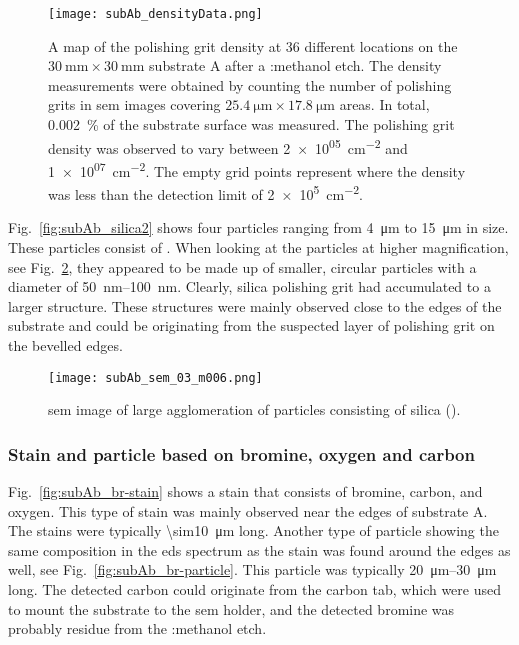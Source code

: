 \begin{figure}[htbp]
    \centering
    \texttt{[image: subAb\_densityData.png]}
    \caption[Map of the polishing grit density on substrate A after a :methanol etch.]{A map of the polishing grit density at 36 different locations on the $\SI{30}{\milli\metre}\times\SI{30}{\milli\metre}$ substrate A after a :methanol etch. The density measurements were obtained by counting the number of polishing grits in \ac{sem} images covering $\SI{25.4}{\micro\metre}\times\SI{17.8}{\micro\metre}$ areas. In total, \SI{0.002}{\percent} of the substrate surface was measured. The polishing grit density was observed to vary between \SI{2e+05}{\centi\metre^{-2}} and \SI{1e+07}{\centi\metre^{-2}}. The empty grid points represent where the density was less than the detection limit of \SI{2e+5}{\centi\metre^{-2}}.}
    \label{fig:subAb_densityData}
\end{figure}

Fig.~\ref{fig:subAb_silica2} shows four particles ranging from \SI{4}{\micro\metre} to \SI{15}{\micro\metre} in size. These particles consist of . When looking at the particles at higher magnification, see Fig.~\ref{fig:subAb_silica2_magnified}, they appeared to be made up of smaller, circular particles with a diameter of \SIrange{50}{100}{\nano\metre}. Clearly, silica polishing grit had accumulated to a larger structure. These structures were mainly observed close to the edges of the substrate and could be originating from the suspected layer of polishing grit on the bevelled edges.

\begin{figure}
    \centering
    \texttt{[image: subAb\_sem\_03\_m006.png]}
    \caption[\Ac{sem} image of large silica agglomeration.]{\Ac{sem} image of large agglomeration of particles consisting of silica ().}\label{fig:subAb_silica2_magnified}
\end{figure}

\subsubsection{Stain and particle based on bromine, oxygen and carbon}

Fig.~\ref{fig:subAb_br-stain} shows a stain that consists of bromine, carbon, and oxygen. This type of stain was mainly observed  near the edges of substrate A. The stains were typically \SI{\sim10}{\micro\metre} long. Another type of particle showing the same composition in the \ac{eds} spectrum as the stain was found around the edges as well, see Fig.~\ref{fig:subAb_br-particle}. This particle was typically \SIrange{20}{30}{\micro\metre} long. The detected carbon could originate from the carbon tab, which were used to mount the substrate to the \ac{sem} holder, and the detected bromine was probably residue from the :methanol etch.

